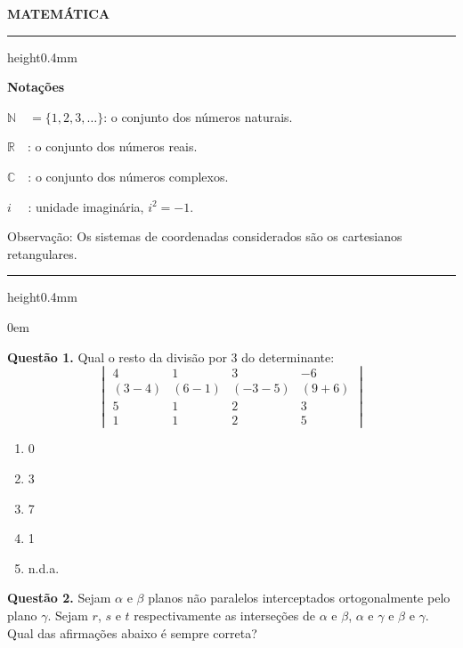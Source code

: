 \documentclass[11pt]{article}
\newcommand*\varhrulefill[1][0.4pt]{\leavevmode\leaders\hrule height#1\hfill\kern0pt}
\begin{document}
\begin{center}
    \textbf{MATEMÁTICA}
\end{center}

\noindent\varhrulefill[0.4mm]

\vspace{6pt}

\noindent \textbf{Notações}

\vspace{6pt}

$\mathbb{N}\quad = \{ 1,2,3, \dots \}$: o conjunto dos números naturais.

$\mathbb{R}\quad$: o conjunto dos números reais.

$\mathbb{C}\quad$: o conjunto dos números complexos.

$i \, \, \quad$: unidade imaginária, $i^2 = -1$.

\vspace{6pt}

\noindent Observação: Os sistemas de coordenadas considerados são os cartesianos retangulares.

\noindent\varhrulefill[0.4mm]

\vspace{6pt}

\parindent0em

\textbf{Questão 1.} Qual o resto da divisão por 3 do determinante:
\[
\begin{vmatrix}
4 & 1 & 3 & -6\\
(3-4) & (6-1) & (-3-5) & (9+6)\\
5 & 1 & 2 & 3\\
1 & 1 & 2 & 5
\end{vmatrix}
\]

\begin{multicols}{5}
    \begin{enumerate}[\bf A (\quad)]
        \item 0 
        \item 3
        \item 7
        \item 1
        \item n.d.a.
    \end{enumerate}
\end{multicols}

\textbf{Questão 2.} Sejam $\alpha$ e $\beta$ planos não paralelos interceptados ortogonalmente pelo plano $\gamma$. Sejam $r$, $s$ e $t$ respectivamente as interseções de $\alpha$ e $\beta$, $\alpha$ e $\gamma$ e $\beta$ e $\gamma$. Qual das afirmações abaixo é sempre correta? 
\end{document}
